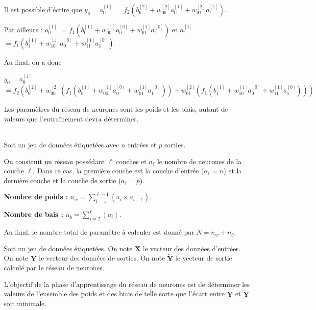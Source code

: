 \begin{exemple}
Il est possible d'écrire que 
$y_0 = a_0^{[1]}$ 
$ = f_2\left(b_0^{[2]}+ w_{00}^{[2]} a_0^{[1]}+ w_{01}^{[2]} a_1^{[1]}\right)$.

Par ailleurs : 
 $  a_0^{[1]}$ 
$ = f_1\left(b_0^{[1]}+ w_{00}^{[1]} a_0^{[0]}+ w_{01}^{[1]} a_1^{[0]}\right)$ et
  $  a_1^{[1]}$ 
$ = f_1\left(b_1^{[1]}+ w_{10}^{[1]} a_0^{[0]}+ w_{11}^{[1]} a_1^{[0]}\right)$.

Au final, on a donc 

$y_0 = a_0^{[1]}$
$ =  f_2\left(b_0^{[2]}+ w_{00}^{[2]}\left(f_1\left(b_0^{[1]}+ w_{00}^{[1]} a_0^{[0]}+ w_{01}^{[1]} a_1^{[0]}\right)\right)+ w_{01}^{[2]} \left( f_1\left(b_1^{[1]}+ w_{10}^{[1]} a_0^{[0]}+ w_{11}^{[1]} a_1^{[0]}\right)\right)\right) $ 


\end{exemple}

\begin{defi}[Paramètres]

Les paramètres du réseau de neurones sont les poids et les biais, autant de valeurs que l’entraînement devra déterminer.

\end{defi}
\begin{methode} ~\\

Soit un jeu de données étiquetées avec $n$ entrées et $p$ sorties.

On construit un réseau possédant $\ell$ couches  et $a_\ell$ le nombre de neurones de la couche  $\ell$. Dans ce cas, la première couche est la couche d'entrée ($a_1 = n$) et la dernière couche et la couche de sortie ($a_\ell= p$).


\textbf{Nombre de poids :} $n_w = \sum\limits_{i=1}^{\ell-1} \left(a_i \times a_{i+1}\right)$.

\textbf{Nombre de bais :} $n_b = \sum\limits_{i=2}^{\ell}\left( a_i  \right)$.


Au final, le nombre total de paramètre à calculer est donné par $N=n_w+n_b$.

\end{methode}
\begin{obj}
Soit un jeu de données étiquetées. On note $\mathbf{X}$ le vecteur des données d'entrées. On note $\mathbf{Y}$ le vecteur des données de sorties. On note
$\mathbf{\tilde{Y}}$ le vecteur de sortie calculé par le réseau de neurones.


L'objectif de la phase d'apprentissage du réseau de neurones est de déterminer les valeurs de  l'ensemble des poids et des biais de telle sorte que l'écart entre $\mathbf{Y}$ 
et $\mathbf{\tilde{Y}}$ soit minimale.
\end{obj}





